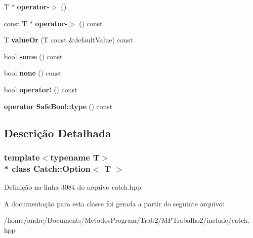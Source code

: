 \begin{DoxyCompactItemize}
\item 
T $\ast$ {\bfseries operator-\/$>$} ()\hypertarget{classCatch_1_1Option_acad340798a16c8f700f8763119e90f31}{}\label{classCatch_1_1Option_acad340798a16c8f700f8763119e90f31}

\item 
const T $\ast$ {\bfseries operator-\/$>$} () const \hypertarget{classCatch_1_1Option_a0800340b2971748671b88acfb14bb928}{}\label{classCatch_1_1Option_a0800340b2971748671b88acfb14bb928}

\item 
T {\bfseries value\+Or} (T const \&default\+Value) const \hypertarget{classCatch_1_1Option_a21b5629a7febbe3e23c475c9d9138a2d}{}\label{classCatch_1_1Option_a21b5629a7febbe3e23c475c9d9138a2d}

\item 
bool {\bfseries some} () const \hypertarget{classCatch_1_1Option_affa96f15798b4656fb753ff52d12dec2}{}\label{classCatch_1_1Option_affa96f15798b4656fb753ff52d12dec2}

\item 
bool {\bfseries none} () const \hypertarget{classCatch_1_1Option_a389324d2aa20ceb0eb0f48a5f77c20c8}{}\label{classCatch_1_1Option_a389324d2aa20ceb0eb0f48a5f77c20c8}

\item 
bool {\bfseries operator!} () const \hypertarget{classCatch_1_1Option_a47a1b6f6def2730ea9d27a1860a4f97f}{}\label{classCatch_1_1Option_a47a1b6f6def2730ea9d27a1860a4f97f}

\item 
{\bfseries operator Safe\+Bool\+::type} () const \hypertarget{classCatch_1_1Option_a637d4366ae7f0ded52ce59c8cb06da7b}{}\label{classCatch_1_1Option_a637d4366ae7f0ded52ce59c8cb06da7b}

\end{DoxyCompactItemize}


\subsection{Descrição Detalhada}
\subsubsection*{template$<$typename T$>$\\*
class Catch\+::\+Option$<$ T $>$}



Definição na linha 3084 do arquivo catch.\+hpp.



A documentação para esta classe foi gerada a partir do seguinte arquivo\+:\begin{DoxyCompactItemize}
\item 
/home/andre/\+Documents/\+Metodos\+Program/\+Trab2/\+M\+P\+Trabalho2/include/catch.\+hpp\end{DoxyCompactItemize}
